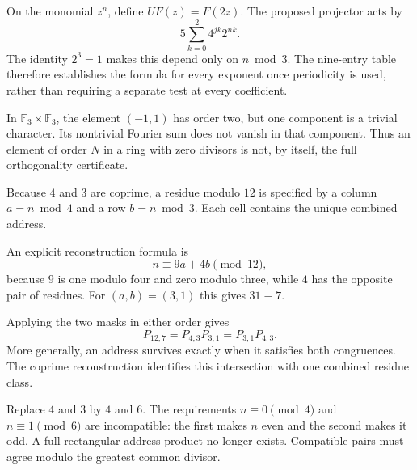 On the monomial $z^n$, define $UF(z)=F(2z)$. The proposed projector acts by
\[
5\sum_{k=0}^2 4^{jk}2^{nk}.
\]
The identity $2^3=1$ makes this depend only on $n\bmod3$. The nine-entry table therefore establishes the formula for every exponent once periodicity is used, rather than requiring a separate test at every coefficient.

In $\mathbb F_3\times\mathbb F_3$, the element $(-1,1)$ has order two, but one component is a trivial character. Its nontrivial Fourier sum does not vanish in that component. Thus an element of order $N$ in a ring with zero divisors is not, by itself, the full orthogonality certificate.


Because $4$ and $3$ are coprime, a residue modulo $12$ is specified by a column $a=n\bmod4$ and a row $b=n\bmod3$. Each cell contains the unique combined address.


An explicit reconstruction formula is
\[
n\equiv9a+4b\pmod{12},
\]
because $9$ is one modulo four and zero modulo three, while $4$ has the opposite pair of residues. For $(a,b)=(3,1)$ this gives $31\equiv7$.

Applying the two masks in either order gives
\[
P_{12,7}=P_{4,3}P_{3,1}=P_{3,1}P_{4,3}.
\]
More generally, an address survives exactly when it satisfies both congruences. The coprime reconstruction identifies this intersection with one combined residue class.

Replace $4$ and $3$ by $4$ and $6$. The requirements $n\equiv0\pmod4$ and $n\equiv1\pmod6$ are incompatible: the first makes $n$ even and the second makes it odd. A full rectangular address product no longer exists. Compatible pairs must agree modulo the greatest common divisor.


